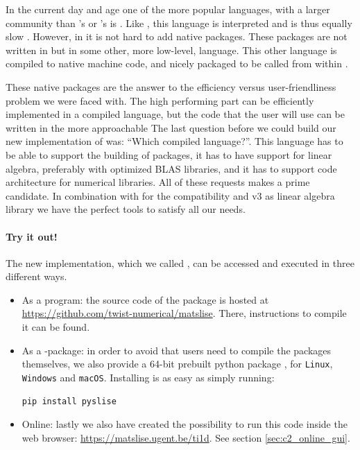 In the current day and age one of the more popular languages, with a larger community than \fortran{}'s or \matlab{}'s is \lpython{}. Like \matlab{}, this language is interpreted and is thus equally slow \cite{chaves_octave_2006,unpingco_comparative_2008}. However, in \lpython{} it is not hard to add native packages. These packages are not written in \lpython{} but in some other, more low-level, language. This other language is compiled to native machine code, and nicely packaged to be called from within \lpython{}.

These native packages are the answer to the efficiency versus user-friendliness problem we were faced with. The high performing part can be efficiently implemented in a compiled language, but the code that the user will use can be written in the more approachable \lpython{} The last question before we could build our new implementation of \matslise{} was: ``Which compiled language?''. This language has to be able to support the building of \lpython{} packages, it has to have support for linear algebra, preferably with optimized BLAS libraries, and it has to support code architecture for numerical libraries. All of these requests makes \cpp{} a prime candidate. In combination with \pybind{} \cite{jakob_pybind11_2017} for the \lpython{} compatibility and \Eigen{} v3 \cite{guennebaud_eigen_2010} as linear algebra library we have the perfect tools to satisfy all our needs.

\paragraph{Try it out!} The new implementation, which we called , can be accessed and executed in three different ways.

\begin{itemize}
    \item As a \cpp{} program: the source code of the package is hosted at \url{https://github.com/twist-numerical/matslise}. There, instructions to compile it can be found.
    \item As a \lpython{}-package: in order to avoid that users need to compile the packages themselves, we also provide a 64-bit prebuilt python package \pyslise{}, for \texttt{Linux}, \texttt{Windows} and \texttt{macOS}. Installing \pyslise{} is as easy as simply running:
\begin{verbatim}
pip install pyslise
\end{verbatim}
    \item Online: lastly we also have created the possibility to run this code inside the web browser: \url{https://matslise.ugent.be/ti1d}. See section \ref{sec:c2_online_gui}.
\end{itemize}

